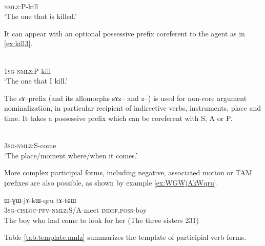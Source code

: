 \documentclass[oldfontcommands,oneside,a4paper,11pt]{article}
\newcommand{\ipa}[1]{{\phon #1}} %
\begin{document}
 \begin{exe} 
\ex \label{ex:kill2}
\gll \ipa{kɤ-sat}    \\
   \textsc{nmlz}:P-kill \\
 \glt  `The one that is killed.'
 \end{exe}
 
It can appear with an optional possessive prefix coreferent to the agent as in \ref{ex:kill3}.
  
  \begin{exe}
\ex \label{ex:kill3}
\gll \ipa{a-kɤ-sat}    \\
   \textsc{1sg-nmlz}:P-kill \\
 \glt  `The one that I kill.'
 \end{exe}

The \ipa{sɤ}--prefix (and its allomorphs \ipa{sɤz}-- and \ipa{z}--) is used for non-core argument nominalization, in particular   recipient of indirective verbs, instruments, place and time. It takes a possessive prefix  which can be coreferent with S, A or P.

   \begin{exe}
\ex \label{ex:come}
\gll \ipa{ɯ-sɤ-ɣi}    \\
   \textsc{3sg-nmlz}:S-come \\
 \glt  `The place/moment where/when it comes.'
 \end{exe}
 
More complex participial forms, including negative, associated motion or TAM prefixes are also possible, as shown by example \ref{ex:WGWjAkWqru}.

 \begin{exe}
\ex \label{ex:WGWjAkWqru}
\gll
  	\ipa{ɯ-ɣɯ-jɤ-kɯ-qru}  	\ipa{tɤ-tɕɯ}  	   \\
  \textsc{3sg-cisloc-pfv-nmlz:}S/A-meet \textsc{indef.poss}-boy   \\
\glt The boy  who had come to look for her (The three sisters 231)
 \end{exe}

Table \ref{tab:template.nmlz} summarizes the template of participial verb forms.

\begin{table}[h]
\caption{The template of participial verb forms in Japhug} \centering \label{tab:template.nmlz}
\end{table}
\end{document}
